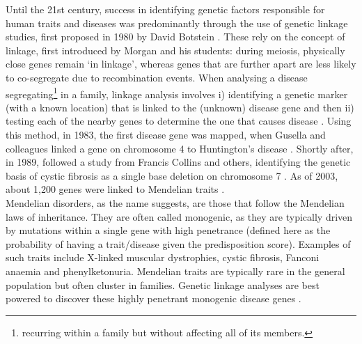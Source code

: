 Until the 21st century, success in identifying genetic factors responsible for human traits and diseases was predominantly 
through the use of genetic linkage studies, first proposed in 1980 by David Botstein \cite{botstein1980construction}.
These rely on the concept of linkage, first introduced by Morgan and his students: during meiosis, physically close genes remain `in linkage', whereas genes that are further apart are less likely to co-segregate due to recombination events.
When analysing a disease segregating\footnote{recurring within a family but without affecting all of its members.} in a family, linkage analysis
involves i) identifying a genetic marker (with a known location) that is linked to the (unknown) disease gene and then ii) testing each of the nearby genes to determine the one that causes disease \cite{teare2005genetic}. 
Using this method, in 1983, the first disease gene was mapped, when Gusella and colleagues linked a gene on chromosome 4 to Huntington's disease \cite{gusella1983polymorphic}.
Shortly after, in 1989, followed a study from Francis Collins and others, identifying the genetic basis of cystic fibrosis as a single base deletion on chromosome 7 \cite{riordan1989identification}.
As of 2003, about 1,200 genes were linked to Mendelian traits \cite{botstein2003discovering}.\\

Mendelian disorders, as the name suggests, are those that follow the Mendelian laws of inheritance.
They are often called monogenic, as they are typically driven by mutations within a single gene with high penetrance (defined here as the probability of having a trait/disease given the predisposition score). 
Examples of such traits include X-linked muscular dystrophies, cystic fibrosis, Fanconi anaemia and phenylketonuria. 
Mendelian traits are typically rare 
in the general population but often cluster in families.
Genetic linkage analyses are best powered to discover these highly penetrant monogenic disease genes \cite{cardon2001association}.\\

